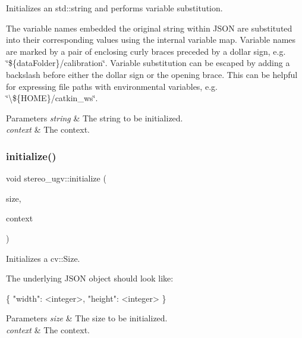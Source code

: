 Initializes an std\+::string and performs variable substitution. 

The variable names embedded the original string within J\+S\+ON are substituted into their corresponding values using the internal variable map. Variable names are marked by a pair of enclosing curly braces preceded by a dollar sign, e.\+g. \char`\"{}\$\{data\+Folder\}/calibration\char`\"{}. Variable substitution can be escaped by adding a backslash before either the dollar sign or the opening brace. This can be helpful for expressing file paths with environmental variables, e.\+g. \char`\"{}\textbackslash{}\$\{\+H\+O\+M\+E\}/catkin\+\_\+ws\char`\"{}. 
\begin{DoxyParams}{Parameters}
{\em string} & The string to be initialized. \\
\hline
{\em context} & The context. \\
\hline
\end{DoxyParams}
\mbox{\label{namespacestereo__ugv_adab204dc6f43824bcda4cd5e172d2812}} 
\subsubsection{\texorpdfstring{initialize()}{initialize()}\hspace{0.1cm}{\footnotesize\ttfamily [4/6]}}
{\footnotesize\ttfamily void stereo\+\_\+ugv\+::initialize (\begin{DoxyParamCaption}\item[{cv\+::\+Size $\ast$}]{size,  }\item[{const \hyperlink{classstereo__ugv_1_1Context}{Context} \&}]{context }\end{DoxyParamCaption})}



Initializes a cv\+::\+Size. 

The underlying J\+S\+ON object should look like\+: 
\begin{DoxyCode}
\{
  \textcolor{stringliteral}{"width"}: <integer>,
  \textcolor{stringliteral}{"height"}: <integer>
\}
\end{DoxyCode}
 
\begin{DoxyParams}{Parameters}
{\em size} & The size to be initialized. \\
\hline
{\em context} & The context. \\
\hline
\end{DoxyParams}
\mbox{\label{namespacestereo__ugv_a0a98148c84d1f085ac51c2f2fb7c8e7a}} 
